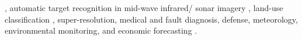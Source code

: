 \cite{Navaratnam2007JointManifoldSemiSupRegression}, automatic target recognition in mid-wave infrared/ sonar imagery \cite{Shen2018ManifoldSensorFusionImageData}, land-use classification \cite{Hong2019LearnableManifoldAlignment}, super-resolution, medical and fault diagnosis, defense, meteorology, environmental monitoring, and economic forecasting   \cite{zhang2010multisourceremotingsensingfusion,Zitova2003SurveyImageRegistrationMethods}. 
%	
%
%
%	
%	
